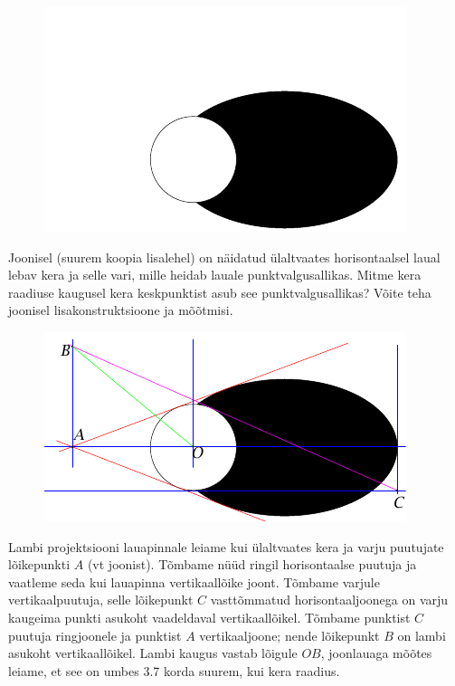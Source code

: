 
\begin{figure}
\vspace{-0.8cm}
  \begin{center}
    \includegraphics[width=1\linewidth]{2024-lahg-06-yl.pdf}
  \end{center}
  \vspace{-0.9cm}
\end{figure}

Joonisel (suurem koopia lisalehel) on näidatud ülaltvaates horisontaalsel laual lebav kera ja selle vari, mille heidab lauale punktvalgusallikas. Mitme kera raadiuse kaugusel kera keskpunktist asub see punktvalgusallikas? Võite teha joonisel lisakonstruktsioone ja mõõtmisi.




\hint

\solu
\begin{figure}[h]
    \centering
    \includegraphics[width=.7\linewidth]{2024-lahg-06-sol.pdf}
\end{figure}

Lambi projektsiooni lauapinnale leiame kui ülaltvaates kera ja varju puutujate lõikepunkti $A$ (vt joonist). Tõmbame nüüd ringil horisontaalse puutuja ja vaatleme seda kui lauapinna vertikaallõike joont. Tõmbame varjule vertikaalpuutuja, selle lõikepunkt $C$ vasttõmmatud horisontaaljoonega on varju kaugeima punkti asukoht vaadeldaval vertikaallõikel. Tõmbame punktist $C$ puutuja ringjoonele ja punktist $A$ vertikaaljoone; nende lõikepunkt $B$ on lambi asukoht vertikaallõikel. Lambi kaugus vastab lõigule $OB$, joonlauaga mõõtes leiame, et see on umbes \SI{3.7}{} korda suurem, kui kera raadius.
\probend